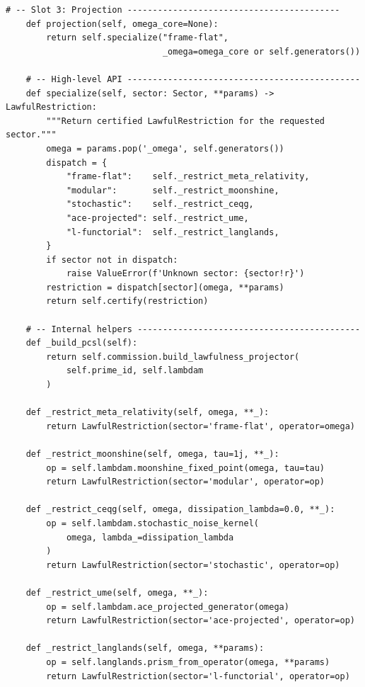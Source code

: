 \documentclass[12pt,a4paper]{article}
\theoremstyle{plain}
\theoremstyle{definition}
\theoremstyle{remark}
\begin{document}
\begin{lstlisting}[caption={multiplicity/multiplicity-Core/omega\_operator.py},
  label=lst:omega]
    # -- Slot 3: Projection ------------------------------------------
    def projection(self, omega_core=None):
        return self.specialize("frame-flat",
                               _omega=omega_core or self.generators())

    # -- High-level API ----------------------------------------------
    def specialize(self, sector: Sector, **params) -> LawfulRestriction:
        """Return certified LawfulRestriction for the requested sector."""
        omega = params.pop('_omega', self.generators())
        dispatch = {
            "frame-flat":    self._restrict_meta_relativity,
            "modular":       self._restrict_moonshine,
            "stochastic":    self._restrict_ceqg,
            "ace-projected": self._restrict_ume,
            "l-functorial":  self._restrict_langlands,
        }
        if sector not in dispatch:
            raise ValueError(f'Unknown sector: {sector!r}')
        restriction = dispatch[sector](omega, **params)
        return self.certify(restriction)

    # -- Internal helpers --------------------------------------------
    def _build_pcsl(self):
        return self.commission.build_lawfulness_projector(
            self.prime_id, self.lambdam
        )

    def _restrict_meta_relativity(self, omega, **_):
        return LawfulRestriction(sector='frame-flat', operator=omega)

    def _restrict_moonshine(self, omega, tau=1j, **_):
        op = self.lambdam.moonshine_fixed_point(omega, tau=tau)
        return LawfulRestriction(sector='modular', operator=op)

    def _restrict_ceqg(self, omega, dissipation_lambda=0.0, **_):
        op = self.lambdam.stochastic_noise_kernel(
            omega, lambda_=dissipation_lambda
        )
        return LawfulRestriction(sector='stochastic', operator=op)

    def _restrict_ume(self, omega, **_):
        op = self.lambdam.ace_projected_generator(omega)
        return LawfulRestriction(sector='ace-projected', operator=op)

    def _restrict_langlands(self, omega, **params):
        op = self.langlands.prism_from_operator(omega, **params)
        return LawfulRestriction(sector='l-functorial', operator=op)
\end{lstlisting}

\end{document}
